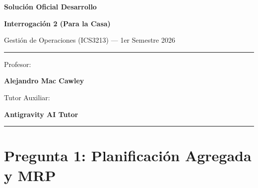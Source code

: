 \documentclass[11pt, a4paper]{article}
\begin{document}
\begin{titlepage}
  \centering
  \vspace*{2cm}
  {\Huge\bfseries\color{gopcyan} Solución Oficial Desarrollo\par}
  \vspace{0.4cm}
  {\LARGE\bfseries Interrogación 2 (Para la Casa)\par}
  \vspace{0.3cm}
  {\large Gestión de Operaciones (ICS3213) --- 1er Semestre 2026\par}
  \vspace{1.2cm}
  \rule{\textwidth}{0.4pt}
  \vspace{0.4cm}
  {\small Profesor:\par}
  {\large\bfseries Alejandro Mac Cawley\par}
  \vspace{0.3cm}
  {\small Tutor Auxiliar:\par}
  {\small\textbf{Antigravity AI Tutor}\par}
  \vspace{0.4cm}
  \rule{\textwidth}{0.4pt}
  \vfill
\end{titlepage}

\newpage


\section{Pregunta 1: Planificación Agregada y MRP}
\end{document}
